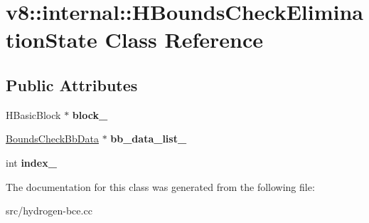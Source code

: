 \hypertarget{classv8_1_1internal_1_1_h_bounds_check_elimination_state}{}\section{v8\+:\+:internal\+:\+:H\+Bounds\+Check\+Elimination\+State Class Reference}
\label{classv8_1_1internal_1_1_h_bounds_check_elimination_state}
\subsection*{Public Attributes}
\begin{DoxyCompactItemize}
\item 
\hypertarget{classv8_1_1internal_1_1_h_bounds_check_elimination_state_a2e68854ceaa4e9812605c1156212e604}{}H\+Basic\+Block $\ast$ {\bfseries block\+\_\+}\label{classv8_1_1internal_1_1_h_bounds_check_elimination_state_a2e68854ceaa4e9812605c1156212e604}

\item 
\hypertarget{classv8_1_1internal_1_1_h_bounds_check_elimination_state_a634f9f88e7c3338108a8f7eff86b92a1}{}\hyperlink{classv8_1_1internal_1_1_bounds_check_bb_data}{Bounds\+Check\+Bb\+Data} $\ast$ {\bfseries bb\+\_\+data\+\_\+list\+\_\+}\label{classv8_1_1internal_1_1_h_bounds_check_elimination_state_a634f9f88e7c3338108a8f7eff86b92a1}

\item 
\hypertarget{classv8_1_1internal_1_1_h_bounds_check_elimination_state_af41f43d7f7013f9cf7158bdc865eebb1}{}int {\bfseries index\+\_\+}\label{classv8_1_1internal_1_1_h_bounds_check_elimination_state_af41f43d7f7013f9cf7158bdc865eebb1}

\end{DoxyCompactItemize}


The documentation for this class was generated from the following file\+:\begin{DoxyCompactItemize}
\item 
src/hydrogen-\/bce.\+cc\end{DoxyCompactItemize}
